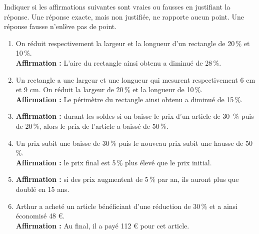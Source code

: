 \bigskip


\begin{exercice}[CRPE 2017 G1-G3 et 2018 G1-G3] %
   Indiquer si les affirmations suivantes sont vraies ou fausses en justifiant la réponse. Une réponse exacte, mais non justifiée, ne rapporte aucun point. Une réponse fausse n’enlève pas de point.
   \begin{enumerate}
      \item On réduit respectivement la largeur et la longueur d’un rectangle de 20\,\% et 10\,\%. \\
         {\bf Affirmation :} \og L’aire du rectangle ainsi obtenu a diminué de 28\,\%. \fg
      \item Un rectangle a une largeur et une longueur qui mesurent respectivement 6 cm et 9 cm. On réduit la largeur de 20\,\% et la longueur de 10\,\%. \\
         {\bf Affirmation :} \og Le périmètre du rectangle ainsi obtenu a diminué de 15\,\%. \fg
      \item {\bf Affirmation :} durant les soldes si on baisse le prix d’un article de 30 \,\% puis de 20\,\%, alors le prix de l’article a baissé de 50\,\%.
      \item Un prix subit une baisse de 30\,\% puis le nouveau prix subit une hausse de 50\,\%. \\
         {\bf Affirmation :} le prix final est 5\,\% plus élevé que le prix initial.
      \item {\bf Affirmation :} si des prix augmentent de 5\,\% par an, ils auront plus que doublé en 15 ans.
      \item Arthur a acheté un article bénéficiant d’une réduction de 30\,\% et a ainsi économisé 48 \euro. \\
         {\bf Affirmation :} Au final, il a payé 112 \euro{} pour cet article.
   \end{enumerate}
\end{exercice}

